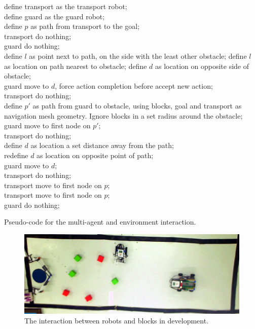 \documentclass[10pt, abstracton, twocolumn]{scrartcl}
\begin{document}
\begin{appendices}
\begin{algorithm}
define transport as the transport robot; \\
define guard as the guard robot; \\
define $p$ as path from transport to the goal; \\
{
transport do nothing; \\
guard do nothing; \\
}
{
{
{
define $l$ as point next to path, on the side with the least other obstacle;
}
{
define $l$ as location on path nearest to obstacle;
}
{
define $d$ as location on opposite side of obstacle; \\
guard move to $d$, force action completion before accept new action; \\
transport do nothing; \\
}
{
define $p'$ as path from guard to obstacle, using blocks, goal and transport as navigation mesh geometry. Ignore blocks in a set radius around the obstacle; \\
guard move to first node on $p'$; \\
transport do nothing; \\
}
}
{
define $d$ as location a set distance away from the path; \\
{
redefine $d$ as location on opposite point of path; \\
}
guard move to $d$; \\
{
transport do nothing; \\
}
{
transport move to first node on $p$; \\
}
}
\uElse
{
transport move to first node on $p$; \\
guard do nothing;
}
}
\caption{Pseudo-code for the multi-agent and environment interaction.}
\label{alg:multiagent}
\end{algorithm}

\begin{figure}
	\centering
	\includegraphics[width=\textwidth]{pictures/photo3development.png}
	\caption{\small The interaction between robots and blocks in development.}
	\label{fig:photo3development}
\end{figure}


\end{appendices}
\end{document}
